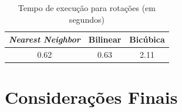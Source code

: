 \documentclass[12pt]{article}
\begin{document}
\begin{table}[H]
\centering
\begin{tabular}{c|c|c}
 \textit{Nearest Neighbor} & Bilinear & Bicúbica  \\
 \hline
 0.62 & 0.63 & 2.11
\end{tabular}
\caption{Tempo de execução para rotações (em segundos)}
\label{tab:rotacoes}
\end{table}

\section{Considerações Finais}

\printbibheading
\printbibliography
\end{document}
